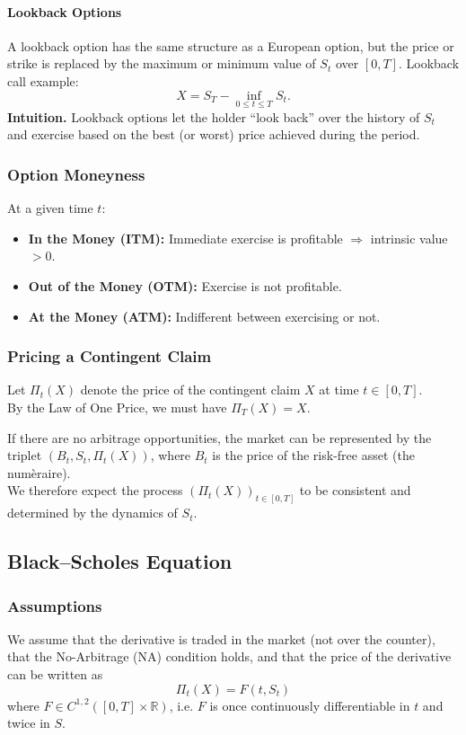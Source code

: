 \documentclass[12pt,a4paper]{article}
\theoremstyle{definition}
\newcommand{\R}{\mathbb{R}}
\begin{document}
\paragraph{Lookback Options} A lookback option has the same structure as a European option, but the price or strike is replaced by the maximum or minimum value of $S_t$ over $[0,T]$. Lookback call example:
\[
X = S_T - \inf_{0\le t\le T} S_t.
\]
\textbf{Intuition.} Lookback options let the holder ``look back'' over the history of $S_t$ and exercise based on the best (or worst) price achieved during the period.

\subsubsection*{Option Moneyness}
At a given time $t$:
\begin{itemize}[leftmargin=*]
  \item \textbf{In the Money (ITM):} Immediate exercise is profitable $\Rightarrow$ intrinsic value $>0$.
  \item \textbf{Out of the Money (OTM):} Exercise is not profitable.
  \item \textbf{At the Money (ATM):} Indifferent between exercising or not.
\end{itemize}

\subsubsection*{Pricing a Contingent Claim}
Let $\Pi_t(X)$ denote the price of the contingent claim $X$ at time $t\in[0,T]$. \\
By the Law of One Price, we must have $\Pi_T(X)=X$.

If there are no arbitrage opportunities, the market can be represented by the triplet $(B_t,S_t,\Pi_t(X))$, where $B_t$ is the price of the risk-free asset (the num\`eraire). \\
We therefore expect the process $(\Pi_t(X))_{t\in[0,T]}$ to be consistent and determined by the dynamics of $S_t$.

\subsection{Black--Scholes Equation}

\subsubsection*{Assumptions}
We assume that the derivative is traded in the market (not over the counter), that the No-Arbitrage (NA) condition holds, and that the price of the derivative can be written as
\[
\Pi_t(X) = F(t, S_t)
\]
where $F \in C^{1,2}([0,T] \times \R)$, i.e. $F$ is once continuously differentiable in $t$ and twice in $S$.
\end{document}
